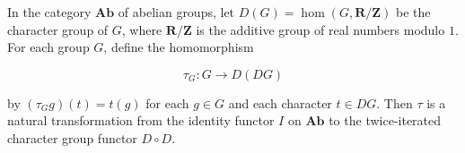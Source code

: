 In the category $\mathbf{Ab}$ of abelian groups, let $D(G) = \hom(G, \mathbf{R}/\mathbf{Z})$ be the character group of $G$, where $\mathbf{R}/\mathbf{Z}$ is the additive group of real numbers modulo $1$. For each group $G$, define the homomorphism

$$\tau_G: G \to D(DG)$$

by $(\tau_G g)(t) = t(g)$ for each $g \in G$ and each character $t \in DG$. Then $\tau$ is a natural transformation from the identity functor $I$ on $\mathbf{Ab}$ to the twice-iterated character group functor $D \circ D$.
